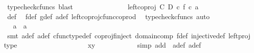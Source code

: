 \begin{isabellebody}
\ {\isacharparenleft}{\kern0pt}typecheck{\isacharunderscore}{\kern0pt}cfuncs{\isacharcomma}{\kern0pt}\ blast{\isacharparenright}{\kern0pt}\isanewline
\ \ \ \ \ \ \ \ \ \ \isamarkupfalse%
\ \isamarkupfalse%
\ {\isachardoublequoteopen}{\isachardot}{\kern0pt}{\isachardot}{\kern0pt}{\isachardot}{\kern0pt}\ {\isacharequal}{\kern0pt}\ {\isacharparenleft}{\kern0pt}left{\isacharunderscore}{\kern0pt}coproj\ C\ D\ {\isasymcirc}\isactrlsub c\ f{\isacharparenright}{\kern0pt}\ {\isasymcirc}\isactrlsub c\ a{\isacharprime}{\kern0pt}{\isachardoublequoteclose}\isanewline
\ \ \ \ \ \ \ \ \ \ \ \ \isamarkupfalse%
\ {\isasymphi}{\isacharunderscore}{\kern0pt}def\ \isamarkupfalse%
\ f{\isacharunderscore}{\kern0pt}def\ g{\isacharunderscore}{\kern0pt}def\ a{\isacharprime}{\kern0pt}{\isacharunderscore}{\kern0pt}def\ left{\isacharunderscore}{\kern0pt}coproj{\isacharunderscore}{\kern0pt}cfunc{\isacharunderscore}{\kern0pt}coprod\ \isamarkupfalse%
\ {\isacharparenleft}{\kern0pt}typecheck{\isacharunderscore}{\kern0pt}cfuncs{\isacharcomma}{\kern0pt}\ auto{\isacharparenright}{\kern0pt}\isanewline
\ \ \ \ \ \ \ \ \ \ \isamarkupfalse%
\ \isamarkupfalse%
\ {\isachardoublequoteopen}a\ {\isacharequal}{\kern0pt}\ a{\isacharprime}{\kern0pt}{\isachardoublequoteclose}\isanewline
\ \ \ \ \ \ \ \ \ \ \ \ \isamarkupfalse%
\ {\isacharparenleft}{\kern0pt}smt\ a{\isacharprime}{\kern0pt}{\isacharunderscore}{\kern0pt}def\ a{\isacharunderscore}{\kern0pt}def\ cfunc{\isacharunderscore}{\kern0pt}type{\isacharunderscore}{\kern0pt}def\ coproj{\isacharunderscore}{\kern0pt}f{\isacharunderscore}{\kern0pt}inject\ domain{\isacharunderscore}{\kern0pt}comp\ f{\isacharunderscore}{\kern0pt}def\ injective{\isacharunderscore}{\kern0pt}def\ left{\isacharunderscore}{\kern0pt}proj{\isacharunderscore}{\kern0pt}type{\isacharparenright}{\kern0pt}\isanewline
\ \ \ \ \ \ \ \ \isamarkupfalse%
\isanewline
\ \ \ \ \ \ \ \ \isamarkupfalse%
\ \isamarkupfalse%
\ {\isachardoublequoteopen}x{\isacharequal}{\kern0pt}y{\isachardoublequoteclose}\isanewline
\ \ \ \ \ \ \ \ \ \ \isamarkupfalse%
\ {\isacharparenleft}{\kern0pt}simp\ add{\isacharcolon}{\kern0pt}\ \ a{\isacharprime}{\kern0pt}{\isacharunderscore}{\kern0pt}def{\isacharparenleft}{\kern0pt}{}{\isacharparenright}{\kern0pt}\ a{\isacharunderscore}{\kern0pt}def{\isacharparenleft}{\kern0pt}{}{\isacharparenright}{\kern0pt}{\isacharparenright}{\kern0pt}\isanewline

\end{isabellebody}
